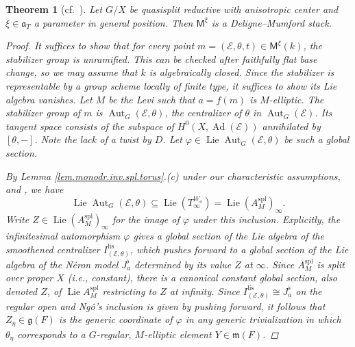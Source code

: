 \documentclass[openany]{amsbook}
\newtheorem{theorem}{Theorem}[chapter]
\theoremstyle{definition}
\theoremstyle{remark}
\numberwithin{equation}{section}
\newcommand{\cE}{\mathcal{E}}
\renewcommand{\phi}{\varphi}
\renewcommand{\-}{\operatorname{-}}
\newcommand{\Aut}{\operatorname{Aut}}
\renewcommand{\a}{\mathfrak{a}}
\newcommand{\on}[1]{\operatorname{#1}}
\newcommand{\fm}{\mathfrak{m}}
\newcommand{\bM}{\mathsf{M}}
\renewcommand{\fm}{\mathfrak{m}}
\renewcommand{\fg}{\mathfrak{g}}
\newcommand{\Lie}{\on{Lie}}
\newcommand{\Ad}{\on{Ad}}
\newcommand{\spl}{\mathrm{spl}}
\begin{document}
\begin{theorem}[{{cf.\ \cite[Th\'{e}or\`{e}me 10.1.1]{CLI}}}]\label{thm.xi.locus.dm}
    Let $G/X$ be quasisplit reductive with anisotropic center and $\xi \in \a_T$ a parameter in general position. Then $\bM^\xi$ is a Deligne--Mumford stack.
    \begin{proof}
        It suffices to show that for every point $m = (\cE, \theta, t) \in \bM^\xi(k)$, the stabilizer group is unramified. This can be checked after faithfully flat base change, so we may assume that $k$ is algebraically closed. Since the stabilizer is representable by a group scheme locally of finite type, it suffices to show its Lie algebra vanishes. Let $M$ be the Levi such that $a=f(m)$ is $M$-elliptic. The stabilizer group of $m$ is $\Aut_G(\cE, \theta)$, the centralizer of $\theta$ in $\Aut_G(\cE)$. Its tangent space consists of the subspace of $H^0(X, \Ad(\cE))$ annihilated by $[\theta, -]$. Note the lack of a twist by $D$. Let $\phi \in \Lie\Aut_G(\cE, \theta)$ be such a global section. 
        
        By Lemma \ref{lem.monodr.inv.spl.torus}.(c) under our characteristic assumptions, and \cite[Corollaire 4.11.3, Lemma 4.14.2]{ngofl}, we have
        $$
            \Lie \Aut_G(\cE, \theta) \subseteq \Lie(T^{W_a}_\infty) = \Lie(A_M^{\spl})_\infty.
        $$
        Write $Z \in \Lie(A_M^{\spl})_\infty$ for the image of $\phi$ under this inclusion. Explicitly, the infinitesimal automorphism $\phi$ gives a global section of the Lie algebra of the smoothened centralizer $I^{\mathrm{lis}}_{(\cE, \theta)}$, which pushes forward to a global section of the Lie algebra of the N\'eron model $J_a^{\flat}$ determined by its value $Z$ at $\infty$. Since $A_M^{\spl}$ is split over proper $X$ (i.e., constant), there is a canonical constant global section, also denoted $Z$, of $\Lie A_M^{\spl}$ restricting to $Z$ at infinity. Since $I^{\mathrm{lis}}_{(\cE, \theta)} \cong J_a^{\flat}$ on the regular open and Ng\^{o}'s inclusion is given by pushing forward, it follows that $Z_\eta \in \fg(F)$ is the generic coordinate of $\phi$ in any generic trivialization in which $\theta_\eta$ corresponds to a $G$-regular, $M$-elliptic element $Y \in \fm(F)$. 
        

\end{proof}
\end{theorem}
\end{document}
